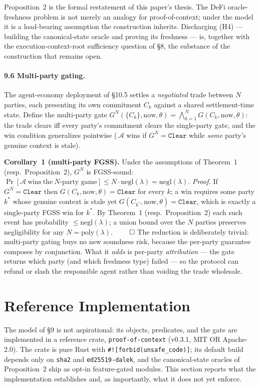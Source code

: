 \documentclass[11pt]{article}
\begin{document}
Proposition~2 is the formal restatement of this paper's thesis. The DeFi oracle-freshness problem is not merely an analogy for proof-of-context; under the model it is a load-bearing assumption the construction inherits. Discharging (H4) --- building the canonical-state oracle and proving its freshness --- is, together with the execution-context-root sufficiency question of \S8, the substance of the construction that remains open.

\paragraph{9.6 Multi-party gating.} The agent-economy deployment of \S10.5 settles a \emph{negotiated} trade between $N$ parties, each presenting its own commitment $C_k$ against a shared settlement-time state. Define the multi-party gate $G^N(\{C_k\}, \mathrm{now}, \theta) = \bigwedge_{k=1}^{N} G(C_k, \mathrm{now}, \theta)$: the trade clears iff every party's commitment clears the single-party gate, and the win condition generalizes pointwise (\,$\mathcal{A}$ wins if $G^N = \texttt{Clear}$ while \emph{some} party's genuine context is stale).

\textbf{Corollary~1 (multi-party FGSS).} Under the assumptions of Theorem~1 (resp.\ Proposition~2), $G^N$ is FGSS-sound: $\Pr[\mathcal{A}\ \mathrm{wins\ the}\ N\text{-party game}] \le N \cdot \mathrm{negl}(\lambda) = \mathrm{negl}(\lambda)$. \emph{Proof.} If $G^N = \texttt{Clear}$ then $G(C_k, \mathrm{now}, \theta) = \texttt{Clear}$ for every $k$; a win requires some party $k^*$ whose genuine context is stale yet $G(C_{k^*}, \mathrm{now}, \theta) = \texttt{Clear}$, which is exactly a single-party FGSS win for $k^*$. By Theorem~1 (resp.\ Proposition~2) each such event has probability $\le \mathrm{negl}(\lambda)$; a union bound over the $N$ parties preserves negligibility for any $N = \mathrm{poly}(\lambda)$. $\qed$ The reduction is deliberately trivial: multi-party gating buys no new soundness risk, because the per-party guarantee composes by conjunction. What it \emph{adds} is per-party \emph{attribution} --- the gate returns which party (and which freshness type) failed --- so the protocol can refund or slash the responsible agent rather than voiding the trade wholesale.

\section{Reference Implementation}

The model of \S9 is not aspirational: its objects, predicates, and the gate are implemented in a reference crate, \texttt{proof-of-context} (v0.3.1, MIT OR Apache-2.0). The crate is pure Rust with \texttt{\#![forbid(unsafe\_code)]}; its default build depends only on \texttt{sha2} and \texttt{ed25519-dalek}, and the canonical-state oracles of Proposition~2 ship as opt-in feature-gated modules. This section reports what the implementation establishes and, as importantly, what it does not yet enforce.
\end{document}
